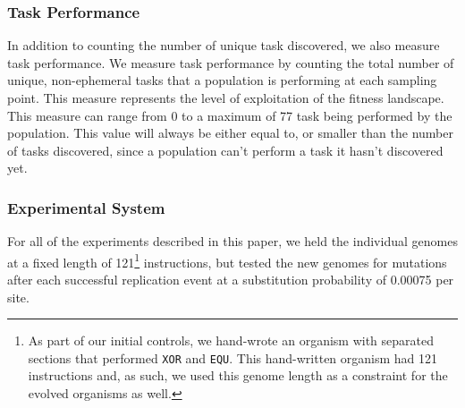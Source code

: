 \documentclass[10pt,letterpaper,final]{article}
\begin{document}
\subsubsection*{Task Performance}
In addition to counting the number of unique task discovered, we also measure task performance. We measure task performance by counting the total number of unique, non-ephemeral tasks that a population is performing at each sampling point. This measure represents the level of exploitation of the fitness landscape. This measure can range from 0 to a maximum of 77 task being performed by the population. This value will always be either equal to, or smaller than the number of tasks discovered, since a population can't perform a task it hasn't discovered yet.   

\subsubsection*{Experimental System}
For all of the experiments described in this paper, we held the individual genomes at a fixed length of 121\footnote{As part of our initial controls, we hand-wrote an organism with separated sections that performed \texttt{XOR} and \texttt{EQU}. This hand-written organism had 121 instructions and, as such, we used this genome length as a constraint for the evolved organisms as well.} instructions, but tested the new genomes for mutations after each successful replication event at a substitution probability of 0.00075 per site. 
\end{document}
